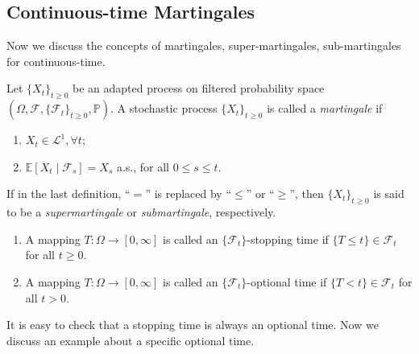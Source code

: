 \subsection{Continuous-time Martingales}
Now we discuss the concepts of martingales, super-martingales, sub-martingales for continuous-time.

\begin{definition}[Martingale]
Let $\{X_t\}_{t\ge0}$ be an adapted process on filtered probability space $(\Omega, \mathcal{F},\{\mathcal{F}_t\}_{t\ge0},\mathbb{P})$.
A stochastic process $\{X_t\}_{t\ge0}$ is called a \emph{martingale} if
\begin{enumerate}
\item
$X_t\in\mathcal{L}^1,\forall t$;
\item
$\mathbb{E}[X_{t}\mid\mathcal{F}_s] = X_s$ a.s., for all $0\le s\le t$.
\end{enumerate}
If in the last definition, ``$=$'' is replaced by ``$\le$'' or ``$\ge$'', then $\{X_t\}_{t\ge0}$
is said to be a \emph{supermartingale} or \emph{submartingale}, respectively.
\end{definition}

\begin{definition}
\begin{enumerate}
\item
A mapping $T:\Omega\to[0,\infty]$ is called an $\{\mathcal{F}_t\}$-stopping time if $\{T\le t\}\in\mathcal{F}_t$ for all $t\ge0$.
\item
A mapping $T:\Omega\to[0,\infty]$ is called an $\{\mathcal{F}_t\}$-optional time if $\{T<t\}\in\mathcal{F}_t$ for all $t>0$.
\end{enumerate}
\end{definition}
It is easy to check that a stopping time is always an optional time.
Now we discuss an example about a specific optional time.


